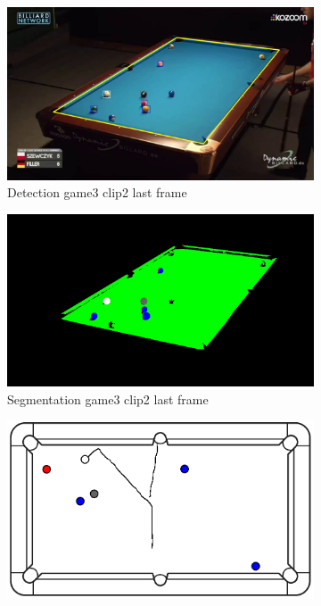 \begin{figure}[H]
\begin{subfigure}[b]{0.48\textwidth}
        \centering
        \includegraphics[width=\textwidth]{images/Detection/game3_clip2_detected_balls_last_frame.jpg}
        \caption{Detection game3 clip2 last frame}
        \label{fig: game3_clip2_last_frame_detected}
    \end{subfigure}
    \begin{subfigure}[b]{0.48\textwidth}
        \centering
        \includegraphics[width=\textwidth]{images/Segmentation/game3_clip2_segmented_balls_last_frame.jpg}
        \caption{Segmentation game3 clip2 last frame}
		\label{fig: game3_clip2_last_frame_segmented}
    \end{subfigure}
    \begin{subfigure}[b]{0.48\textwidth}
    	\centering
    	\includegraphics[width=\textwidth]{images/AllMinimap/game3_clip2_minimap.png}

\end{subfigure}
\end{figure}
